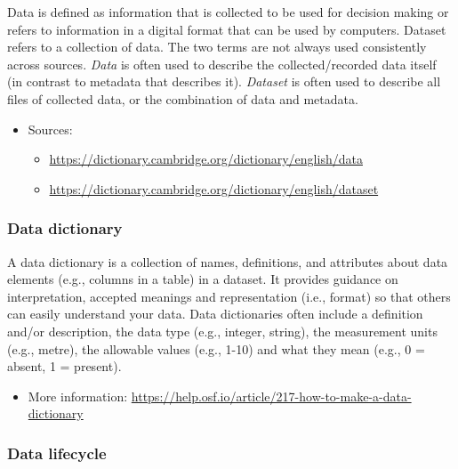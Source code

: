 \documentclass[
]{book}
\providecommand{\tightlist}{%
  \setlength{\itemsep}{0pt}\setlength{\parskip}{0pt}}
\begin{document}
Data is defined as information that is collected to be used for decision making or refers to information in a digital format that can be used by computers. Dataset refers to a collection of data. The two terms are not always used consistently across sources. \emph{Data} is often used to describe the collected/recorded data itself (in contrast to metadata that describes it). \emph{Dataset} is often used to describe all files of collected data, or the combination of data and metadata.

\begin{itemize}
\tightlist
\item
  Sources:

  \begin{itemize}
  \tightlist
  \item
    \url{https://dictionary.cambridge.org/dictionary/english/data}
  \item
    \url{https://dictionary.cambridge.org/dictionary/english/dataset}
  \end{itemize}
\end{itemize}

\hypertarget{data-dictionary}{%
\subsubsection*{Data dictionary}\label{data-dictionary}}

A data dictionary is a collection of names, definitions, and attributes about data elements (e.g., columns in a table) in a dataset. It provides guidance on interpretation, accepted meanings and representation (i.e., format) so that others can easily understand your data. Data dictionaries often include a definition and/or description, the data type (e.g., integer, string), the measurement units (e.g., metre), the allowable values (e.g., 1-10) and what they mean (e.g., 0 = absent, 1 = present).

\begin{itemize}
\tightlist
\item
  More information: \url{https://help.osf.io/article/217-how-to-make-a-data-dictionary}
\end{itemize}

\hypertarget{datalifecycle}{%
\subsubsection*{Data lifecycle}\label{datalifecycle}}
\end{document}
